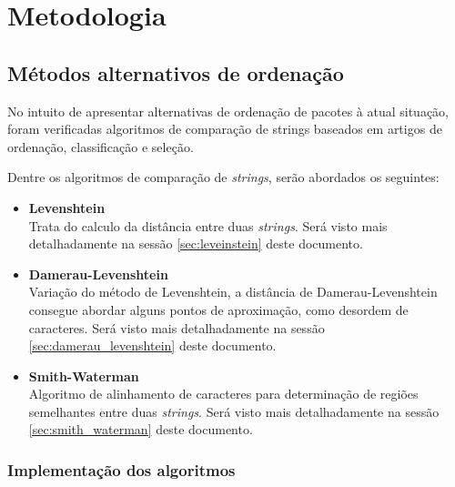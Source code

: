 \chapter{\nmu Metodologia} %
\label{cha:metodologia}



\section{Métodos alternativos de ordenação} %
\label{sec:m_todos_alternativos_de_ordena_o}

No intuito de apresentar alternativas de ordenação de pacotes à atual situação, foram verificadas algoritmos de comparação de strings baseados em artigos de ordenação, classificação e seleção.

Dentre os algoritmos de comparação de \textit{strings}, serão abordados os seguintes:

\begin{itemize}
	\item \textbf{Levenshtein}\\
	Trata do calculo da distância entre duas \textit{strings}. Será visto mais detalhadamente na sessão \ref{sec:leveinstein} deste documento.
%
	\item \textbf{Damerau-Levenshtein}\\
	Variação do método de Levenshtein, a distância de Damerau-Levenshtein consegue abordar alguns pontos de aproximação, como desordem de caracteres. Será visto mais detalhadamente na sessão \ref{sec:damerau_levenshtein} deste documento.
%
	\item \textbf{Smith-Waterman}\\
	Algoritmo de alinhamento de caracteres para determinação de regiões semelhantes entre duas \textit{strings}. Será visto mais detalhadamente na sessão \ref{sec:smith_waterman} deste documento.

\end{itemize}

\subsection{Implementação dos algoritmos} %
\label{sub:implementa_o_dos_algoritmos}

